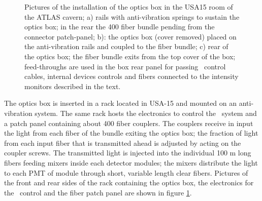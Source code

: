 \begin{figure}[htbp]
\begin{center}
\caption{Pictures of the installation of the optics box in the USA15 room of the
ATLAS cavern; a) rails with anti-vibration springs to sustain the optics box; in the
rear the 400 fiber bundle pending from the connector patch-panel; b): the optics box
(cover removed) placed on the anti-vibration rails and coupled to the fiber bundle;
c) rear of the optics box; the fiber bundle exits from the top cover of the box;
feed-throughs are used in the box rear panel for passing \laser~control cables,
internal devices controls and fibers connected to the intensity monitors described
in the text.  
}\label{fig:x.1}
\end{center}
\end{figure}

The optics box is inserted in a rack located in USA-15 and mounted on an anti-vibration system. 
The same rack hosts the electronics 
to control the \lasii~system and a patch panel containing about 400 fiber
couplers. The couplers receive in input the light from each fiber of the bundle
exiting the optics box; the fraction of light from each input fiber that is transmitted
ahead is adjusted by acting on the coupler screws. The transmitted light is injected
into the individual 100 m long fibers feeding mixers inside each detector modules;
the mixers distribute the light to each PMT of module through short, variable length
clear fibers. Pictures of the front and rear sides of the rack containing the
optics box, the electronics for the \lasii~control and the fiber patch panel are shown in figure \ref{fig:x.1}.

